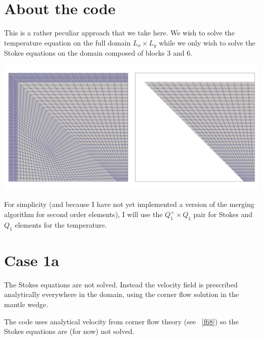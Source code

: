 \section*{About the code}

This is a rather peculiar approach that we take here. We wish to solve the 
temperature equation on the full domain $L_x \times L_y$ while 
we only wish to solve the Stokes equations on the domain composed of 
blocks 3 and 6. 

\begin{center}
\includegraphics[width=14cm]{python_codes/fieldstone_149/results/meshing/meshes}
\end{center}


For simplicity (and because I have not yet implemented a version of the 
merging algorithm for second order elements), I will use 
the $Q_1^+\times Q_1$ pair for Stokes and $Q_1$ elements for the temperature.





\newpage
\section*{Case 1a}

The Stokes equations are not solved. Instead the velocity field
is prescribed analytically everywhere in the domain, using the corner flow solution 
in the mantle wedge. 

The code uses analytical velocity from corner flow theory (see \stone~\ref{f68})
so the Stokes equations are (for now) not solved. 


